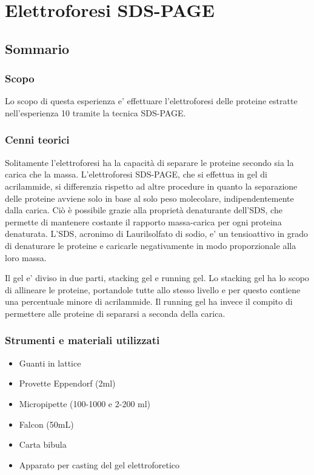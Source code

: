 \section{\LARGE{Elettroforesi SDS-PAGE}}

\vspace{0.6cm}


\subsection{Sommario}

\subsubsection{Scopo}

Lo scopo di questa esperienza e' effettuare l'elettroforesi
delle proteine estratte nell'esperienza 10 tramite la
tecnica SDS-PAGE.

\subsubsection{Cenni teorici}

Solitamente l'elettroforesi ha la capacit\`a di separare le proteine secondo sia
la carica che la massa.
L'elettroforesi SDS-PAGE, che si effettua in gel di acrilammide, si differenzia
rispetto ad altre procedure in quanto la separazione delle proteine
avviene solo in base al solo peso molecolare, indipendentemente dalla carica.
Ci\`o \`e possibile grazie alla propriet\`a denaturante dell'SDS,
che permette di mantenere costante il rapporto massa-carica per ogni proteina denaturata.
L'SDS, acronimo di Laurilsolfato di sodio, e' un tensioattivo in grado di denaturare le proteine e
caricarle negativamente in modo proporzionale alla loro massa.

Il gel e' diviso in due parti, stacking gel e running gel. Lo stacking gel
ha lo scopo di allineare le proteine, portandole tutte allo stesso livello e per
questo contiene una percentuale minore di acrilammide.
Il running gel ha invece il compito di permettere alle proteine di separarsi a
seconda della carica.

\subsubsection{Strumenti e materiali utilizzati}

\begin{itemize}
\item Guanti in lattice
\item Provette Eppendorf (2ml)
\item Micropipette (100-1000 e 2-200 ml)
\item Falcon (50mL)
\item Carta bibula
\item Apparato per casting del gel elettroforetico
\end{itemize}

